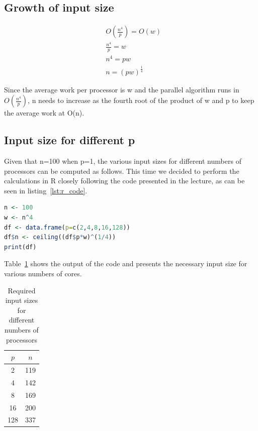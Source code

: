 \documentclass[a4paper,%
11pt,%
DIV12,
headsepline,%
headings=normal,
]{scrartcl}
\begin{document}
\subsection{Growth of input size}

\begin{align*}
    & O(\frac{n^4}{p}) = O(w)\\ 
    & \frac{n^4}{p} = w \\
    & n^4 = pw \\
    & n = {(pw)}^{\frac{1}{4}}
\end{align*}

Since the average work per processor is w and the parallel algorithm runs in $O(\frac{n^4}{p})$, n needs to increase as the fourth root of the product of w and p to keep the average work at O(n).

\subsection{Input size for different p}

Given that n=100 when p=1, the various input sizes for different numbers of processors can be computed as follows. This time we decided to perform the calculations in R closely following the code presented in the lecture, as can be seen in listing~\ref{lst:r_code}.

\begin{lstlisting}[language=R, caption={Calculation n for various values of p}, label={lst:r_code}]
n <- 100
w <- n^4
df <- data.frame(p=c(2,4,8,16,128))
df$n <- ceiling((df$p*w)^(1/4))
print(df)
\end{lstlisting}

Table~\ref{tab:input_sizes} shows the output of the code and presents the necessary input size for various numbers of cores.

\begin{table}[htbp]
    \centering
    \label{tab:input_sizes}
    \begin{tabular}{cc}
    \toprule
    $p$ & $n$ \\
    \midrule
    2 & 119 \\
    4 & 142 \\
    8 & 169 \\
    16 & 200 \\
    128 & 337 \\
    \bottomrule
    \end{tabular}
    \caption{Required input sizes for different numbers of processors}
\end{table}
\end{document}
